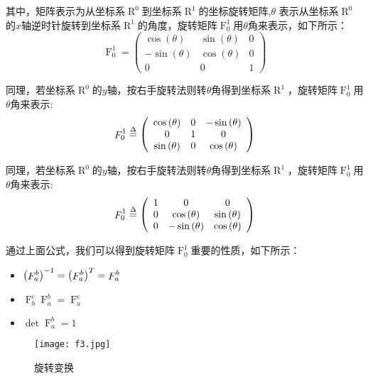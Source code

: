其中，矩阵表示为从坐标系$\mathop R\nolimits^0$到坐标系$\mathop R\nolimits^1$的坐标旋转矩阵,$\theta$ 表示从坐标系$\mathop R\nolimits^0$的$x$轴逆时针旋转到坐标系$\mathop R\nolimits^1$的角度，旋转矩阵$\mathop F\nolimits_0^1 $用$\theta$角来表示，如下所示：
\[\mathop F\nolimits_0^1  = \left( {\begin{array}{*{20}{c}}
{\cos \left( \theta  \right)}&{\sin \left( \theta  \right)}&0\\
{ - \sin \left( \theta  \right)}&{\cos \left( \theta  \right)}&0\\
0&0&1
\end{array}} \right)\]

同理，若坐标系$\mathop R\nolimits^0$的$y$轴，按右手旋转法则转$\theta$角得到坐标系$\mathop R\nolimits^1$，旋转矩阵$\mathop F\nolimits_0^1 $用$\theta$角来表示:
\[\mathop F\nolimits_0^1  \buildrel \Delta \over = \left( {\begin{array}{*{20}{c}}
{\cos \left( \theta  \right)}&0&{ - \sin \left( \theta  \right)}\\
0&1&0\\
{\sin \left( \theta  \right)}&0&{\cos \left( \theta  \right)}
\end{array}} \right)\]

同理，若坐标系$\mathop R\nolimits^0$的$y$轴，按右手旋转法则转$\theta$角得到坐标系$\mathop R\nolimits^1$，旋转矩阵$\mathop F\nolimits_0^1 $用$\theta$角来表示:
\[\mathop F\nolimits_0^1  \buildrel \Delta \over = \left( {\begin{array}{*{20}{c}}
1&0&0\\
0&{\cos \left( \theta  \right)}&{\sin \left( \theta  \right)}\\
0&{ - \sin \left( \theta  \right)}&{\cos \left( \theta  \right)}
\end{array}} \right)\]

通过上面公式，我们可以得到旋转矩阵$\mathop F\nolimits_0^1 $重要的性质，如下所示：
\begin{itemize}
  \item ${\left( {\mathop F\nolimits_a^b } \right)^{{\rm{ - }}1}} = {\left( {\mathop F\nolimits_a^b } \right)^T} = \mathop F\nolimits_a^b $
  \item $\mathop F\nolimits_b^c \mathop F\nolimits_a^b  = \mathop F\nolimits_a^c $
  \item $\det \mathop F\nolimits_a^b  = 1$
\end{itemize}

\begin{figure}[!ht]
\centering
\texttt{[image: f3.jpg]}
\caption{旋转变换}
\label{fig3}
\end{figure}

